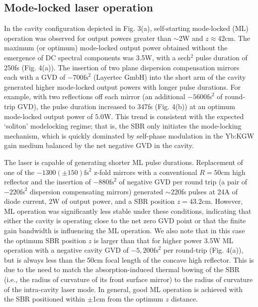 \subsection{Mode-locked laser operation}

In the cavity configuration depicted in Fig. 3(a), self-starting mode-locked (ML) operation was observed for output powers greater than $\sim$2W and $z \approx 42$cm.
The maximum (or optimum) mode-locked output power obtained without the emergence of DC spectral components was 3.5W, with a sech$^2$ pulse duration of 250fs (Fig. 4(a)).
The insertion of two plane dispersion compensation mirrors each with a GVD of $-700\text{fs}^2$ (Layertec GmbH\cite{website_layertec}) into the short arm of the cavity generated higher mode-locked output powers with longer pulse durations.
For example, with two reflections off each mirror (an additional $-5600\text{fs}^2$ of round-trip GVD), the pulse duration increased to 347fs (Fig. 4(b)) at an optimum mode-locked output power of $5.0$W.
This trend is consistent with the expected ‘soliton’ modelocking regime; that is, the SBR only initiates the mode-locking mechanism, which is quickly dominated by self-phase modulation in the Yb:KGW gain medium balanced by the net negative GVD in the cavity\cite{Brunner_diode_pumped}.

The laser is capable of generating shorter ML pulse durations.
Replacement of one of the $-1300 ( \pm 150 ) \text{fs}^2$ z-fold mirrors with a conventional $R = 50$cm high reflector and the insertion of $-880\text{fs}^2$ of negative GVD per round trip (a pair of $-220\text{fs}^2$ dispersion compensating mirrors) generated $\sim220$fs pulses at 24A of diode current, 2W of output power, and a SBR position $z = 43.2$cm.
However, ML operation was significantly less stable under these conditions, indicating that either the cavity is operating close to the net zero GVD point or that the finite gain bandwidth is influencing the ML operation.
We also note that in this case the optimum SBR position $z$ is larger than that for higher power 3.5W ML operation with a negative cavity GVD of $-5,200\text{fs}^2$ per round-trip (Fig. 4(a)), but is always less than the 50cm focal length of the concave high reflector.
This is due to the need to match the absorption-induced thermal bowing of the SBR (i.e., the radius of curvature of its front surface mirror) to the radius of curvature of the intra-cavity laser mode\cite{Schieffer_dual_passive_2006}.
In general, good ML operation is achieved with the SBR positioned within $\pm$1cm from the optimum $z$ distance.

